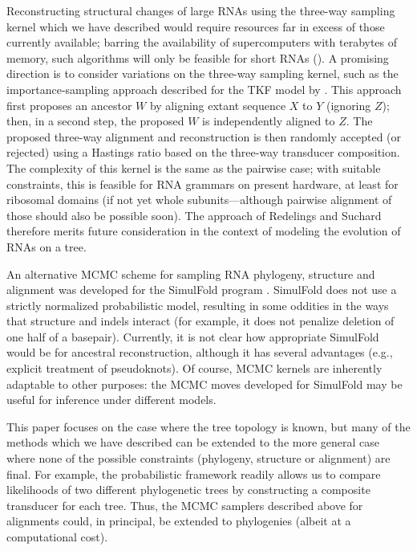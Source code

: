 \documentclass[10pt]{article}
\begin{document}

Reconstructing structural changes of large RNAs
using the three-way sampling kernel which we have described
would require resources far in excess of those currently available;
barring the availability of supercomputers with terabytes of memory,
such algorithms will only be feasible for short RNAs ().
A promising direction is to consider variations on the three-way sampling kernel,
such as the importance-sampling approach described for the TKF model
by \cite{RedelingsSuchard2005}.
This approach first proposes an ancestor $W$ by aligning extant
sequence $X$ to $Y$ (ignoring $Z$); then, in a second step, the proposed $W$ is
independently aligned to $Z$. The proposed three-way alignment and
reconstruction is then randomly accepted (or rejected) using a
Hastings ratio based on the three-way transducer composition. The
complexity of this kernel is the same as the pairwise case;
with suitable constraints, this is feasible for RNA
grammars on present hardware, at least for ribosomal domains (if not
yet whole subunits---although pairwise alignment of those should also
be possible soon). The approach of Redelings and Suchard therefore
merits future consideration in the context of modeling the evolution
of RNAs on a tree.

An alternative MCMC scheme for sampling RNA phylogeny, structure and
alignment was developed for the SimulFold program
\cite{MeyerMiklos2007}.  SimulFold does not use a strictly normalized
probabilistic model, resulting in some oddities in the ways that
structure and indels interact (for example, it does not penalize
deletion of one half of a basepair).  Currently, it is not clear how
appropriate SimulFold would be for ancestral reconstruction, although
it has several advantages (e.g., explicit treatment of pseudoknots).
Of course, MCMC kernels are inherently adaptable to other purposes:
the MCMC moves developed for SimulFold may be useful for inference
under different models.

This paper focuses on the case where the tree topology is known, but
many of the methods which we have described can be extended to the
more general case where none of the possible constraints (phylogeny,
structure or alignment) are final.  For example, the probabilistic
framework readily allows us to compare likelihoods of two different
phylogenetic trees by constructing a composite transducer for each
tree.  Thus, the MCMC samplers described above for alignments could,
in principal, be extended to phylogenies (albeit at a computational
cost).
\end{document}
